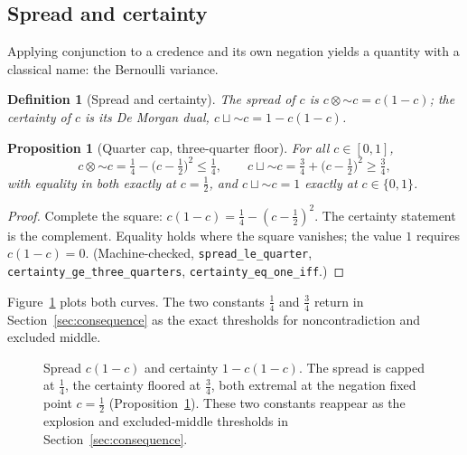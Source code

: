 \documentclass[11pt,a4paper]{article}
\newtheorem{proposition}[theorem]{Proposition}
\newtheorem{definition}[theorem]{Definition}
\newcommand{\negc}{\mathord{\sim}}
\newcommand{\conjc}{\otimes}
\newcommand{\disjc}{\sqcup}
\begin{document}
\subsection{Spread and certainty}

Applying conjunction to a credence and its own negation yields a
quantity with a classical name: the Bernoulli variance.

\begin{definition}[Spread and certainty]
\label{def:spread}
The \emph{spread} of $c$ is $c \conjc \negc c = c(1-c)$; the
\emph{certainty} of $c$ is its De Morgan dual,
$c \disjc \negc c = 1 - c(1-c)$.
\end{definition}

\begin{proposition}[Quarter cap, three-quarter floor]
\label{prop:spread}
For all $c \in [0,1]$,
\[
c \conjc \negc c
  = \tfrac{1}{4} - \bigl(c - \tfrac{1}{2}\bigr)^2
  \leq \tfrac{1}{4},
\qquad
c \disjc \negc c
  = \tfrac{3}{4} + \bigl(c - \tfrac{1}{2}\bigr)^2
  \geq \tfrac{3}{4},
\]
with equality in both exactly at $c = \tfrac{1}{2}$, and
$c \disjc \negc c = 1$ exactly at $c \in \{0,1\}$.
\end{proposition}

\begin{proof}
Complete the square: $c(1-c) = \tfrac{1}{4} - (c - \tfrac{1}{2})^2$.
The certainty statement is the complement.
Equality holds where the square vanishes; the value $1$ requires
$c(1-c) = 0$.
(Machine-checked, \texttt{spread\_le\_quarter},
\texttt{certainty\_ge\_three\_quarters},
\texttt{certainty\_eq\_one\_iff}.)
\end{proof}

Figure~\ref{fig:spread} plots both curves.
The two constants $\tfrac{1}{4}$ and $\tfrac{3}{4}$ return in
Section~\ref{sec:consequence} as the exact thresholds for
noncontradiction and excluded middle.

\begin{figure}[ht]
\centering
{}
\caption{Spread $c(1-c)$ and certainty $1 - c(1-c)$.
The spread is capped at $\tfrac{1}{4}$, the certainty floored at
$\tfrac{3}{4}$, both extremal at the negation fixed point
$c = \tfrac{1}{2}$ (Proposition~\ref{prop:spread}).
These two constants reappear as the explosion and excluded-middle
thresholds in Section~\ref{sec:consequence}.}
\label{fig:spread}
\end{figure}
\end{document}
